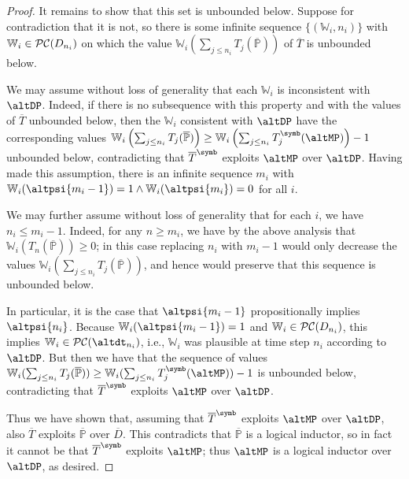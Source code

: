 \documentclass[authordate,onecolumn,noenvironments]{miri-tech-article}
\numberwithin{equation}{subsection}
\newcommand{\seq}[1]{{\overline{#1}}}
\newcommand{\li}{logical inductor}
\newcommand{\trade}{T}%
\newcommand{\Trader}{\seq{\trade}} %
\newcommand{\BelState}{\mathbb{P}}
\newcommand{\pt}{\BelState}
\newcommand{\MP}{\seq{\pt}}
\newcommand{\dt}{D}
\newcommand{\DP}{\seq{\dt}}
\newcommand{\pcworlds}{\mathcal{P\-C}}
\newcommand{\World}{\mathbb{W}}
\begin{document}
\begin{proof}
It remains to show that this set is unbounded below. Suppose for contradiction that it is not, so 
there is some infinite sequence $\{(\World_i, n_i)\}$ with $\World_i\in\pcworlds(\dt_{n_i})$ on which the value $\World_i \left( {\textstyle \sum_{j \leq n_i}
\trade_j(\MP) } \right)  $   of $\Trader$ is unbounded below.

We may assume without loss of generality that each $\World_i$ is inconsistent with $\altDP$. Indeed, if there is no subsequence with this property and with the
values of $\Trader$ unbounded below, then  the 
$\World_i$ consistent with $\altDP$ have the corresponding values $\World_i \left( {\textstyle \sum_{j \leq n_i}
\trade_j(\MP) } \right)  \geq \World_i \left( {\textstyle \sum_{j \leq n_i}
\trade^\symb_j(\altMP) } \right)-1 $ unbounded below, contradicting that 
$\Trader^\symb$ exploits $\altMP$ over  $\altDP$. 
Having made this assumption, there is an infinite sequence $m_i$ with $\World_i(\altpsi{m_i-1}) = 1 \wedge \World_i(\altpsi{m_i}) = 0$ for all $i$.


We may further assume without loss of generality that for each $i$, we have $n_i \leq m_i-1$.  Indeed, for any $n \ge m_i$, we have by the above analysis that 
$\World_i \left( { \textstyle  \trade_n (\MP) } \right) \ge 0$; in this case replacing $n_i$ with $m_i-1$  would only decrease  the values
$\World_i ( {\textstyle \sum_{j \leq n_i}
\trade_j(\MP) } ) $, and hence would preserve that this sequence is unbounded below. 

In particular, it is the case that $\altpsi{m_i - 1}$ propositionally
implies $\altpsi{n_i}$. 
Because $\World_i(\altpsi{m_i - 1}) = 1$ and $\World_i\in\pcworlds(\dt_{n_i})$, this implies $\World_i\in\pcworlds(\altdt_{n_i})$, i.e., $\World_i$ was
plausible at time step $n_i$ according to $\altDP$.  
But then we have that the sequence of values $\World_i ( {\textstyle \sum_{j \leq n_i}
\trade_j(\MP) } )  \geq \World_i ( {\textstyle \sum_{j \leq n_i}
\trade^\symb_j(\altMP) } )-1 $ is unbounded below, contradicting that $\Trader^\symb$ exploits $\altMP$ over $\altDP$. 


Thus we have shown that, assuming that $\Trader^\symb$ exploits $\altMP$ over $\altDP$, also $\Trader$ exploits $\MP$ over $\DP$.  This contradicts that $\MP$
is a \li{}, so in fact it cannot be that $\Trader^\symb$ exploits $\altMP$; thus $\altMP$ is a \li{} over $\altDP$, as desired.

\end{proof}
\end{document}
